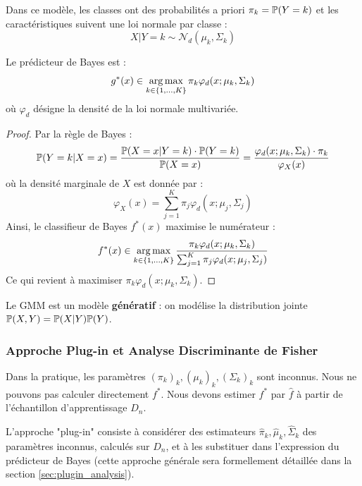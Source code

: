 \begin{definition}
Dans ce modèle, les classes ont des probabilités a priori $\pi_k = \mathbb{P}(Y=k)$ et les caractéristiques suivent une loi normale par classe : 
\begin{equation}
X|Y=k \sim \mathcal{N}_{d}(\mu_{k},\Sigma_{k})
\end{equation}
\end{definition}

\begin{proposition}
Le prédicteur de Bayes est :
\begin{equation}
g^{*}(x)\in \operatorname*{arg\,max}_{k\in\{1,...,K\}} \pi_{k}\varphi_{d}(x;\mu_{k},\Sigma_{k})
\end{equation}
où $\varphi_d$ désigne la densité de la loi normale multivariée.
\end{proposition}

\begin{proof}
Par la règle de Bayes :
\[
\mathbb{P}(Y=k | X=x) = \frac{\mathbb{P}(X=x | Y=k) \cdot \mathbb{P}(Y=k)}{\mathbb{P}(X=x)} = \frac{\varphi_d(x; \mu_k, \Sigma_k) \cdot \pi_k}{\varphi_X(x)}
\]
où la densité marginale de $X$ est donnée par :
\[
\varphi_X(x) = \sum_{j=1}^K \pi_j \varphi_d(x; \mu_j, \Sigma_j)
\]
Ainsi, le classifieur de Bayes $f^*(x)$ maximise le numérateur :
\[
f^*(x) \in \operatorname*{arg\,max}_{k \in \{1,\ldots,K\}} \frac{\pi_k \varphi_d(x; \mu_k, \Sigma_k)}{\sum_{j=1}^K \pi_j \varphi_d(x; \mu_j, \Sigma_j)}
\]
Ce qui revient à maximiser $\pi_k \varphi_d(x; \mu_k, \Sigma_k)$.
\end{proof}

\begin{remarque}
Le GMM est un modèle \textbf{génératif} : on modélise la distribution jointe $\mathbb{P}(X, Y) = \mathbb{P}(X|Y)\mathbb{P}(Y)$.
\end{remarque}

\subsubsection{Approche Plug-in et Analyse Discriminante de Fisher}

Dans la pratique, les paramètres $(\pi_k)_k, (\mu_k)_k, (\Sigma_k)_k$ sont inconnus. Nous ne pouvons pas calculer directement $f^*$. Nous devons estimer $f^*$ par $\hat{f}$ à partir de l'échantillon d'apprentissage $D_n$.

L'approche "plug-in" consiste à considérer des estimateurs $\hat{\pi}_k, \hat{\mu}_k, \hat{\Sigma}_k$ des paramètres inconnus, calculés sur $D_n$, et à les substituer dans l'expression du prédicteur de Bayes (cette approche générale sera formellement détaillée dans la section \ref{sec:plugin_analysis}).

